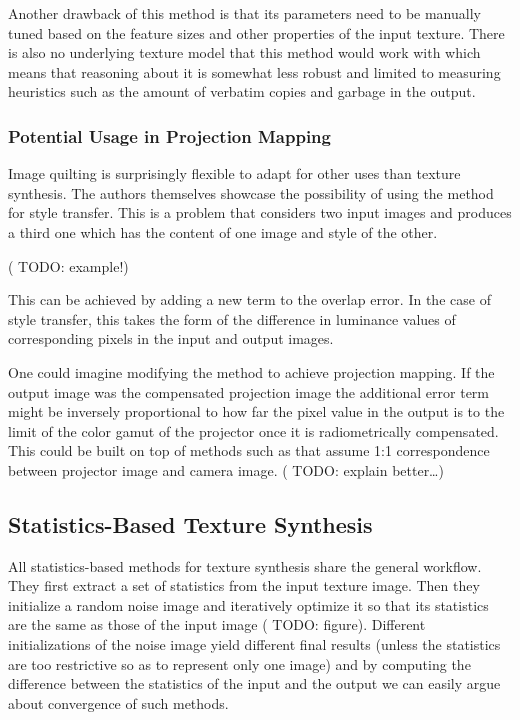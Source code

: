 Another drawback of this method is that its parameters need to be manually tuned based on the feature sizes and other properties of the input texture. There is also no underlying texture model that this method would work with which means that reasoning about it is somewhat less robust and limited to measuring heuristics such as the amount of verbatim copies and garbage in the output.

\subsubsection{Potential Usage in Projection Mapping}
\label{section:background-texture_synthesis-patch_based-projection_mapping}

Image quilting is surprisingly flexible to adapt for other uses than texture synthesis. The authors themselves showcase the possibility of using the method for style transfer. This is a problem that considers two input images and produces a third one which has the content of one image and style of the other.

({\color{red} TODO: example!})

This can be achieved by adding a new term to the overlap error. In the case of style transfer, this takes the form of the difference in luminance values of corresponding pixels in the input and output images.

One could imagine modifying the method to achieve projection mapping. If the output image was the compensated projection image the additional error term might be inversely proportional to how far the pixel value in the output is to the limit of the color gamut of the projector once it is radiometrically compensated. This could be built on top of methods such as \citet{Grundhofer2015} that assume 1:1 correspondence between projector image and camera image. ({\color{red} TODO: explain better\dots})

\subsection{Statistics-Based Texture Synthesis}
\label{section:background-texture_synthesis-statistics_based}

All statistics-based methods for texture synthesis share the general workflow. They first extract a set of statistics from the input texture image. Then they initialize a random noise image and iteratively optimize it so that its statistics are the same as those of the input image ({\color{red} TODO: figure}). Different initializations of the noise image yield different final results (unless the statistics are too restrictive so as to represent only one image) and by computing the difference between the statistics of the input and the output we can easily argue about convergence of such methods.

